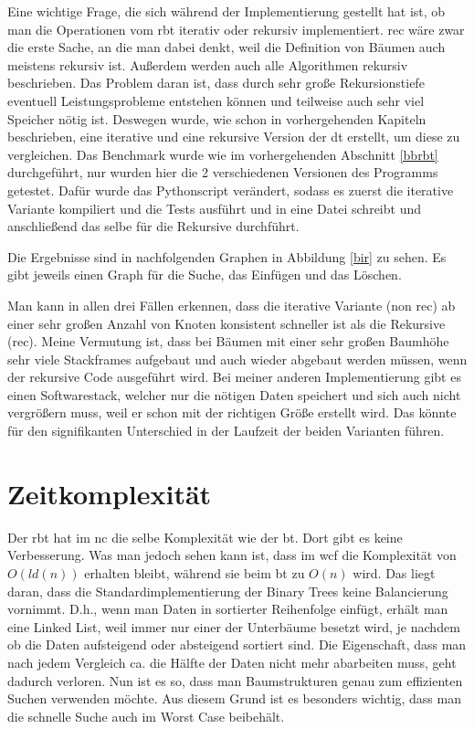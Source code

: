 \documentclass[11pt]{article}
\begin{document}
Eine wichtige Frage, die sich während der Implementierung gestellt hat ist, ob man die Operationen vom \gls{rbt} iterativ oder rekursiv implementiert. 
\gls{rec} wäre zwar die erste Sache, an die man dabei denkt, weil die Definition von Bäumen auch meistens rekursiv ist. Außerdem werden auch alle Algorithmen rekursiv beschrieben. 
Das Problem daran ist, dass durch sehr große Rekursionstiefe eventuell Leistungsprobleme entstehen können und teilweise auch sehr viel Speicher nötig ist. 
Deswegen wurde, wie schon in vorhergehenden Kapiteln beschrieben, eine iterative und eine rekursive Version der \gls{dt} erstellt, um diese zu vergleichen.
Das Benchmark wurde wie im vorhergehenden Abschnitt \ref{bbrbt} durchgeführt, nur wurden hier die 2 verschiedenen Versionen des Programms getestet.
Dafür wurde das Pythonscript verändert, sodass es zuerst die iterative Variante kompiliert und die Tests ausführt und in eine Datei schreibt und anschließend das selbe für die Rekursive durchführt. 

Die Ergebnisse sind in nachfolgenden Graphen in Abbildung \ref{bir} zu sehen. Es gibt jeweils einen Graph für die Suche, das Einfügen und das Löschen.

Man kann in allen drei Fällen erkennen, dass die iterative Variante (non rec) ab einer sehr großen Anzahl von Knoten konsistent schneller ist als die Rekursive (rec).
Meine Vermutung ist, dass bei Bäumen mit einer sehr großen Baumhöhe sehr viele Stackframes aufgebaut und auch wieder abgebaut werden müssen, wenn der rekursive Code ausgeführt wird.
Bei meiner anderen Implementierung gibt es einen Softwarestack, welcher nur die nötigen Daten speichert und sich auch nicht vergrößern muss, weil er schon mit der richtigen Größe erstellt wird.
Das könnte für den signifikanten Unterschied in der Laufzeit der beiden Varianten führen.

\section{Zeitkomplexität} \label{time}

Der \gls{rbt} hat im \gls{nc} die selbe Komplexität wie der \gls{bt}. Dort gibt es keine Verbesserung.
Was man jedoch sehen kann ist, dass im \gls{wcf} die Komplexität von $O(ld(n))$ erhalten bleibt, während sie beim \gls{bt} zu $O(n)$ wird.
Das liegt daran, dass die Standardimplementierung der Binary Trees keine Balancierung vornimmt. D.h., wenn man Daten in sortierter Reihenfolge einfügt, 
erhält man eine Linked List, weil immer nur einer der Unterbäume besetzt wird, je nachdem ob die Daten aufsteigend oder absteigend sortiert sind. Die Eigenschaft, 
dass man nach jedem Vergleich ca. die Hälfte der Daten nicht mehr abarbeiten muss, geht dadurch verloren. 
Nun ist es so, dass man Baumstrukturen genau zum effizienten Suchen verwenden möchte. Aus diesem Grund ist es besonders wichtig, dass man die schnelle Suche auch im Worst Case beibehält.
\end{document}

